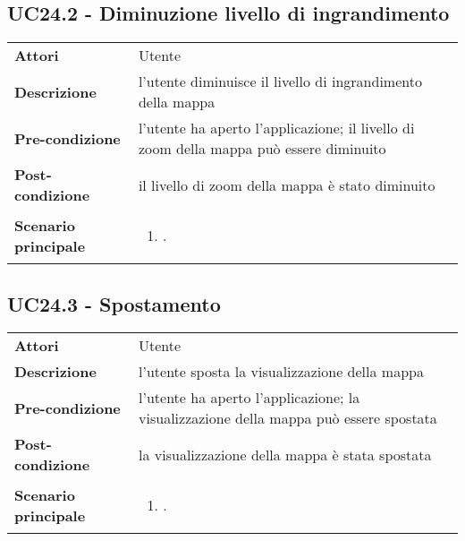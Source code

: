 \subsection{UC24.2 - Diminuzione livello di ingrandimento} 
\label{sssec:UC24.2} 
\def\arraystretch{1.5}
\begin{tabularx}{\textwidth}{l|p{}}
	\rowcolor{I} \multicolumn{2}{c}{\color{white}\textbf{UC24.2 - Diminuzione livello di ingrandimento}} \\
	\toprule
	\endhead
	\textbf{Attori} & Utente\\
	\textbf{Descrizione} & l'utente diminuisce il livello di ingrandimento della mappa\\
	\textbf{Pre-condizione} & l'utente ha aperto l'applicazione; il livello di zoom della mappa può essere diminuito\\
	\textbf{Post-condizione} & il livello di zoom della mappa è stato diminuito\\
	\textbf{Scenario principale} & \vspace{-1.2em}\begin{enumerate}[leftmargin=*,noitemsep,nosep]
		\item \nameref{sssec:UC24.2}.
	\end{enumerate}\\
	\bottomrule
\end{tabularx}
\subsection{UC24.3 - Spostamento} 
\label{sssec:UC24.3} 
\def\arraystretch{1.5}
\begin{tabularx}{\textwidth}{l|p{}}
	\rowcolor{I} \multicolumn{2}{c}{\color{white}\textbf{UC24.3 - Spostamento}} \\
	\toprule
	\endhead
	\textbf{Attori} & Utente\\
	\textbf{Descrizione} & l'utente sposta la visualizzazione della mappa\\
	\textbf{Pre-condizione} & l'utente ha aperto l'applicazione; la visualizzazione della mappa può essere spostata\\
	\textbf{Post-condizione} & la visualizzazione della mappa è stata spostata\\
	\textbf{Scenario principale} & \vspace{-1.2em}\begin{enumerate}[leftmargin=*,noitemsep,nosep]
		\item \nameref{sssec:UC24.3}.
	\end{enumerate}\\
	\bottomrule
\end{tabularx}
